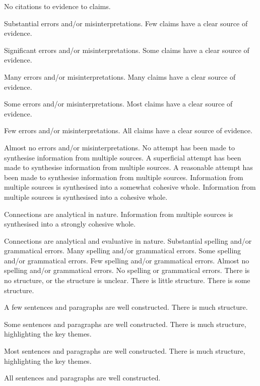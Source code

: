 \documentclass{../../fal_assignment}
\begin{document}
\begin{markingrubric}
        \grade\fail 	No citations to evidence to claims.
        \par 		Substantial errors and/or misinterpretations.
        \grade 		Few claims have a clear source of evidence.
        \par 		Significant errors and/or misinterpretations.
        \grade 		Some claims have a clear source of evidence.
        \par 		Many errors and/or misinterpretations.
        \grade 		Many claims have a clear source of evidence.
        \par 		Some errors and/or misinterpretations.
        \grade 		Most claims have a clear source of evidence.
        \par 		Few errors and/or misinterpretations.
        \grade 		All claims have a clear source of evidence.
        \par 		Almost no errors and/or misinterpretations.
%
        \grade\fail No attempt has been made to synthesise information from multiple sources.
        \grade		A superficial attempt has been made to synthesise information from multiple sources.
        \grade		A reasonable attempt has been made to synthesise information from multiple sources.
        \grade		Information from multiple sources is synthesised into a somewhat cohesive whole.
        \grade		Information from multiple sources is synthesised into a cohesive whole.
        \par		Connections are analytical in nature.
        \grade		Information from multiple sources is synthesised into a strongly cohesive whole.
        \par		Connections are analytical and evaluative in nature.
%
        \grade\fail 	Substantial spelling and/or grammatical errors.
        \grade 		Many spelling and/or grammatical errors.
        \grade 		Some spelling and/or grammatical errors.  
        \grade 		Few spelling and/or grammatical errors.
        \grade 		Almost no spelling and/or grammatical errors.
        \grade 		No spelling or grammatical errors.
%
        \grade\fail 	There is no structure, or the structure is unclear.
        \grade 		There is little structure.
        \grade 		There is some structure.
        \par 		A few sentences and paragraphs are well constructed.
        \grade 		There is much structure.
        \par 		Some sentences and paragraphs are well constructed.
        \grade 		There is much structure, highlighting the key themes.
        \par 		Most sentences and paragraphs are well constructed.
        \grade 		There is much structure, highlighting the key themes.
        \par 		All sentences and paragraphs are well constructed.
\end{markingrubric}
\end{document}
